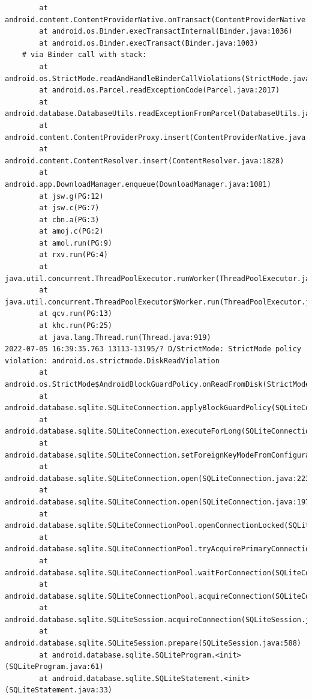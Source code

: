 \documentclass[a4paper,12pt]{book}
\begin{document}
\begin{lstlisting}
        at android.content.ContentProviderNative.onTransact(ContentProviderNative.java:154)
        at android.os.Binder.execTransactInternal(Binder.java:1036)
        at android.os.Binder.execTransact(Binder.java:1003)
    # via Binder call with stack:
        at android.os.StrictMode.readAndHandleBinderCallViolations(StrictMode.java:2289)
        at android.os.Parcel.readExceptionCode(Parcel.java:2017)
        at android.database.DatabaseUtils.readExceptionFromParcel(DatabaseUtils.java:137)
        at android.content.ContentProviderProxy.insert(ContentProviderNative.java:481)
        at android.content.ContentResolver.insert(ContentResolver.java:1828)
        at android.app.DownloadManager.enqueue(DownloadManager.java:1081)
        at jsw.g(PG:12)
        at jsw.c(PG:7)
        at cbn.a(PG:3)
        at amoj.c(PG:2)
        at amol.run(PG:9)
        at rxv.run(PG:4)
        at java.util.concurrent.ThreadPoolExecutor.runWorker(ThreadPoolExecutor.java:1167)
        at java.util.concurrent.ThreadPoolExecutor$Worker.run(ThreadPoolExecutor.java:641)
        at qcv.run(PG:13)
        at khc.run(PG:25)
        at java.lang.Thread.run(Thread.java:919)
2022-07-05 16:39:35.763 13113-13195/? D/StrictMode: StrictMode policy violation: android.os.strictmode.DiskReadViolation
        at android.os.StrictMode$AndroidBlockGuardPolicy.onReadFromDisk(StrictMode.java:1571)
        at android.database.sqlite.SQLiteConnection.applyBlockGuardPolicy(SQLiteConnection.java:1138)
        at android.database.sqlite.SQLiteConnection.executeForLong(SQLiteConnection.java:688)
        at android.database.sqlite.SQLiteConnection.setForeignKeyModeFromConfiguration(SQLiteConnection.java:290)
        at android.database.sqlite.SQLiteConnection.open(SQLiteConnection.java:223)
        at android.database.sqlite.SQLiteConnection.open(SQLiteConnection.java:197)
        at android.database.sqlite.SQLiteConnectionPool.openConnectionLocked(SQLiteConnectionPool.java:505)
        at android.database.sqlite.SQLiteConnectionPool.tryAcquirePrimaryConnectionLocked(SQLiteConnectionPool.java:949)
        at android.database.sqlite.SQLiteConnectionPool.waitForConnection(SQLiteConnectionPool.java:699)
        at android.database.sqlite.SQLiteConnectionPool.acquireConnection(SQLiteConnectionPool.java:380)
        at android.database.sqlite.SQLiteSession.acquireConnection(SQLiteSession.java:896)
        at android.database.sqlite.SQLiteSession.prepare(SQLiteSession.java:588)
        at android.database.sqlite.SQLiteProgram.<init>(SQLiteProgram.java:61)
        at android.database.sqlite.SQLiteStatement.<init>(SQLiteStatement.java:33)

\end{lstlisting}
\end{document}
